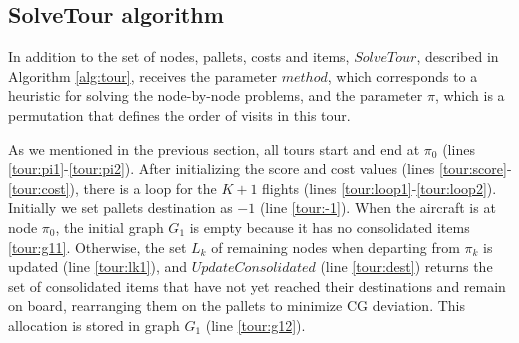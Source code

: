 \documentclass[preprint,authoryear]{elsarticle}
\begin{document}
\subsection{SolveTour algorithm}
\label{tour}

In addition to the set of nodes, pallets, costs and items, $SolveTour$, described in Algorithm \ref{alg:tour}, receives the parameter $method$, which corresponds to a heuristic for solving the node-by-node problems, and the parameter $\pi$, which is a permutation that defines the order of visits in this tour.

As we mentioned in the previous section, all tours start and end at $\pi_0$\/ (lines \ref{tour:pi1}-\ref{tour:pi2}).
After initializing the score and cost values (lines \ref{tour:score}-\ref{tour:cost}), there is a loop for the $K+1$\/ flights (lines \ref{tour:loop1}-\ref{tour:loop2}). Initially we set pallets destination as $-1$\/ (line \ref{tour:-1}). When the aircraft is at node $\pi_0$, the initial graph $G_1$\/ is empty because it has no consolidated items \ref{tour:g11}. Otherwise, the set $L_k$\/ of remaining nodes when departing from $\pi_k$ is updated (line \ref{tour:lk1}), and $UpdateConsolidated$\/ (line \ref{tour:dest}) returns the set of consolidated items that have not yet reached their destinations and remain on board, rearranging them on the pallets to minimize CG deviation. This allocation is stored in graph $G_1$\/ (line \ref{tour:g12}).
\end{document}

